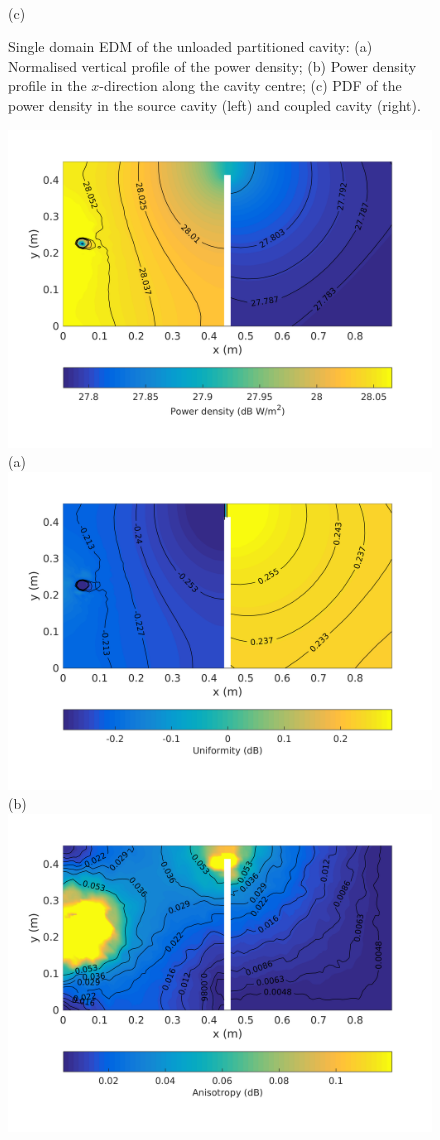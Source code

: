 \documentclass[a4paper]{article}
\numberwithin{equation}{section}
\begin{document}
\begin{figure}[ht]
\begin{center}
\\
{\footnotesize (c)}\\
\vspace{-2mm}
\caption{\label{fg:partemptysdm_profs} Single domain EDM of the unloaded partitioned cavity: (a) Normalised vertical profile of the power density; 
(b) Power density profile in the $x$-direction along the cavity centre; (c) PDF of the power density in the source cavity (left) and coupled cavity (right).}
\end{center}
\end{figure}

\begin{figure}[ht]
\begin{center}
\includegraphics[trim={0 11mm 0 12mm},clip,width=0.52\linewidth]{figures/SDM_3D_DU_PowerDensityMap}\\
{\footnotesize (a)}\\
\vspace{2mm}
\includegraphics[trim={0 11mm 0 12mm},clip,width=0.52\linewidth]{figures/SDM_3D_DU_EnergyDensityUniformityMap}\\
{\footnotesize (b)}\\
\vspace{2mm}
\includegraphics[trim={0 11mm 0 12mm},clip,width=0.52\linewidth]{figures/SDM_3D_DU_EnergyDensityAnisotropyMap}\\

\end{center}
\end{figure}
\end{document}
